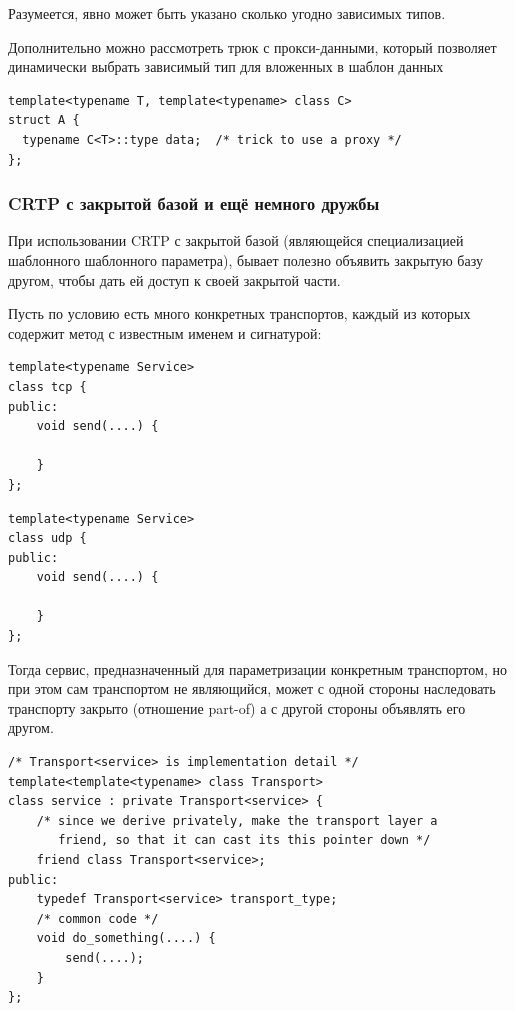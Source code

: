 \documentclass[a4paper,12pt,oneside]{article}
\begin{document}
Разумеется, явно может быть указано сколько угодно зависимых типов.

Дополнительно можно рассмотреть трюк с прокси-данными, который позволяет динамически выбрать зависимый тип для вложенных в шаблон данных

\begin{lstlisting}
template<typename T, template<typename> class C>
struct A {
  typename C<T>::type data;  /* trick to use a proxy */
};
\end{lstlisting}

\subsubsection{CRTP с закрытой базой и ещё немного дружбы}\label{ClosedCRTP}

При использовании CRTP с закрытой базой (являющейся специализацией шаблонного шаблонного параметра), бывает полезно объявить закрытую базу другом, чтобы дать ей доступ к своей закрытой части.

Пусть по условию есть много конкретных транспортов, каждый из которых содержит метод с известным именем и сигнатурой:

\begin{lstlisting}
template<typename Service>
class tcp {
public:
    void send(....) {

    }
};
\end{lstlisting}

\begin{lstlisting}
template<typename Service>
class udp {
public:
    void send(....) {

    }
};
\end{lstlisting}

Тогда сервис, предназначенный для параметризации конкретным транспортом, но при этом сам транспортом не являющийся, может с одной стороны наследовать транспорту закрыто (отношение part-of) а с другой стороны объявлять его другом.

\begin{lstlisting}
/* Transport<service> is implementation detail */
template<template<typename> class Transport>
class service : private Transport<service> {
    /* since we derive privately, make the transport layer a 
       friend, so that it can cast its this pointer down */
    friend class Transport<service>;
public:
    typedef Transport<service> transport_type;
    /* common code */
    void do_something(....) { 
        send(....);
    }
};
\end{lstlisting}
\end{document}
